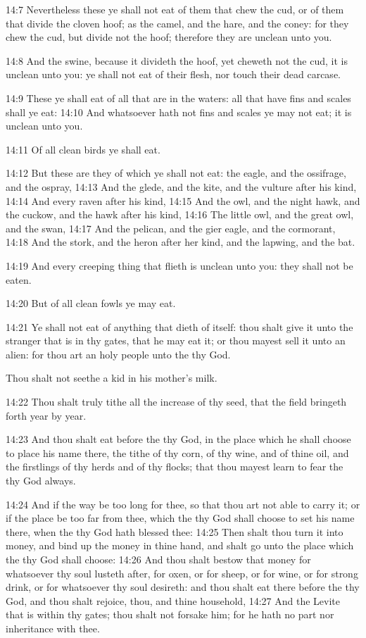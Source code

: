 14:7 Nevertheless these ye shall not eat of them that chew the cud, or of them that divide the cloven hoof; as the camel, and the hare, and the coney: for they chew the cud, but divide not the hoof; therefore they are unclean unto you.

14:8 And the swine, because it divideth the hoof, yet cheweth not the cud, it is unclean unto you: ye shall not eat of their flesh, nor touch their dead carcase.

14:9 These ye shall eat of all that are in the waters: all that have fins and scales shall ye eat: 14:10 And whatsoever hath not fins and scales ye may not eat; it is unclean unto you.

14:11 Of all clean birds ye shall eat.

14:12 But these are they of which ye shall not eat: the eagle, and the ossifrage, and the ospray, 14:13 And the glede, and the kite, and the vulture after his kind, 14:14 And every raven after his kind, 14:15 And the owl, and the night hawk, and the cuckow, and the hawk after his kind, 14:16 The little owl, and the great owl, and the swan, 14:17 And the pelican, and the gier eagle, and the cormorant, 14:18 And the stork, and the heron after her kind, and the lapwing, and the bat.

14:19 And every creeping thing that flieth is unclean unto you: they shall not be eaten.

14:20 But of all clean fowls ye may eat.

14:21 Ye shall not eat of anything that dieth of itself: thou shalt give it unto the stranger that is in thy gates, that he may eat it; or thou mayest sell it unto an alien: for thou art an holy people unto the \LORD thy God.

Thou shalt not seethe a kid in his mother's milk.

14:22 Thou shalt truly tithe all the increase of thy seed, that the field bringeth forth year by year.

14:23 And thou shalt eat before the \LORD thy God, in the place which he shall choose to place his name there, the tithe of thy corn, of thy wine, and of thine oil, and the firstlings of thy herds and of thy flocks; that thou mayest learn to fear the \LORD thy God always.

14:24 And if the way be too long for thee, so that thou art not able to carry it; or if the place be too far from thee, which the \LORD thy God shall choose to set his name there, when the \LORD thy God hath blessed thee: 14:25 Then shalt thou turn it into money, and bind up the money in thine hand, and shalt go unto the place which the \LORD thy God shall choose: 14:26 And thou shalt bestow that money for whatsoever thy soul lusteth after, for oxen, or for sheep, or for wine, or for strong drink, or for whatsoever thy soul desireth: and thou shalt eat there before the \LORD thy God, and thou shalt rejoice, thou, and thine household, 14:27 And the Levite that is within thy gates; thou shalt not forsake him; for he hath no part nor inheritance with thee.

